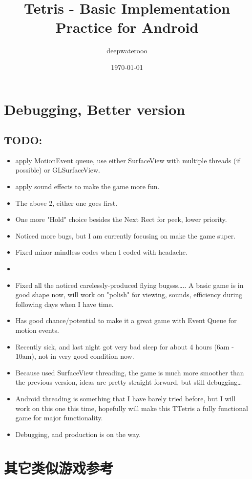 \documentclass[9pt,b5paper]{article}
\author{deepwaterooo}
\date{\today}
\title{Tetris - Basic Implementation Practice for Android}
\begin{document}
\maketitle
\tableofcontents


\section{Debugging, Better version}
\label{sec-1}
\subsection{TODO:}
\label{sec-1-1}
\begin{itemize}
\item apply MotionEvent queue, use either SurfaceView with multiple threads (if possible) or GLSurfaceView.
\item apply sound effects to make the game more fun.
\item The above 2, either one goes first.
\item One more "Hold" choice besides the Next Rect for peek, lower priority.
\item Noticed more bugs, but I am currently focusing on make the game super.
\item Fixed minor mindless codes when I coded with headache.
\item 
\item Fixed all the noticed carelessly-produced flying bugsss\ldots{}.. A basic game is in good shape now, will work on "polish" for viewing, sounds, efficiency during following days when I have time.
\item Has good chance/potential to make it a great game with Event Queue for motion events.
\item Recently sick, and last night got very bad sleep for about 4 hours (6am - 10am), not in very good condition now.
\item Because used SurfaceView threading, the game is much more smoother than the previous version, ideas are pretty straight forward, but still debugging\ldots{}
\item Android threading is something that I have barely tried before, but I will work on this one this time, hopefully will make this TTetris a fully functional game for major functionality.
\item Debugging, and production is on the way.
\end{itemize}

\section{其它类似游戏参考}
\label{sec-2}
\end{document}

